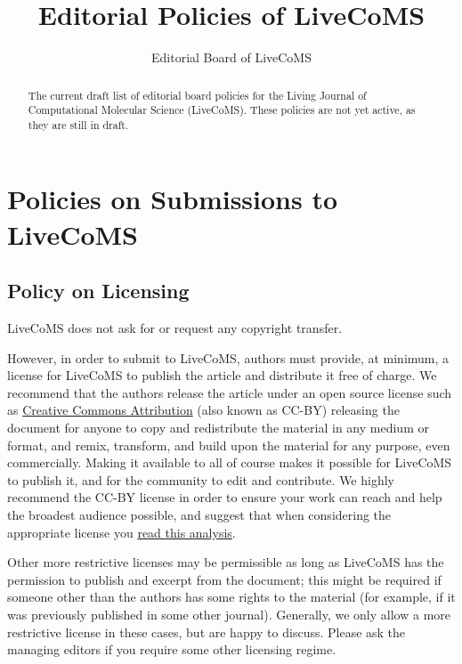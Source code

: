 \documentclass{article}
\begin{document}
\title{Editorial Policies of LiveCoMS}
\author{Editorial Board of LiveCoMS}

\maketitle

\begin{abstract}
The current draft list of editorial board policies for the Living
Journal of Computational Molecular Science (LiveCoMS). These policies
are not yet active, as they are still in draft.
\end{abstract}

\section{Policies on Submissions to LiveCoMS}

\subsection{Policy on Licensing}

LiveCoMS does not ask for or request any copyright transfer.

However, in order to submit to LiveCoMS, authors must provide, at
minimum, a license for LiveCoMS to publish the article and distribute
it free of charge. We recommend that the authors release the article
under an open source license such as \href{https://creativecommons.org/licenses/by/4.0/}{Creative Commons
  Attribution} (also
known as CC-BY) releasing the document for anyone to copy and
redistribute the material in any medium or format, and remix,
transform, and build upon the material for any purpose, even
commercially.  Making it available to all of course makes it possible
for LiveCoMS to publish it, and for the community to edit and
contribute.  We highly recommend the CC-BY license in order to ensure
your work can reach and help the broadest audience possible, and
suggest that when considering the appropriate license you \href{http://openaccess.ox.ac.uk/2013/06/13/cc-by-what-does-it-mean-for-scholarly-articles-3/}{read this analysis}.

Other more restrictive licenses may be permissible as long as LiveCoMS
has the permission to publish and excerpt from the document; this
might be required if someone other than the authors has some rights to
the material (for example, if it was previously published in some
other journal). Generally, we only allow a more restrictive license in
these cases, but are happy to discuss. Please ask the managing editors
if you require some other licensing regime.
\end{document}
